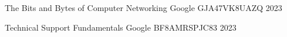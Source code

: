 

\begin{cvhonors}

  \cvhonor
    {The Bits and Bytes of Computer Networking} %
    {Google} %
    {GJA47VK8UAZQ} %
    {2023} %

  \cvhonor
    {Technical Support Fundamentals} %
    {Google} %
    {BF8AMRSPJC83} %
    {2023} %

\end{cvhonors}
